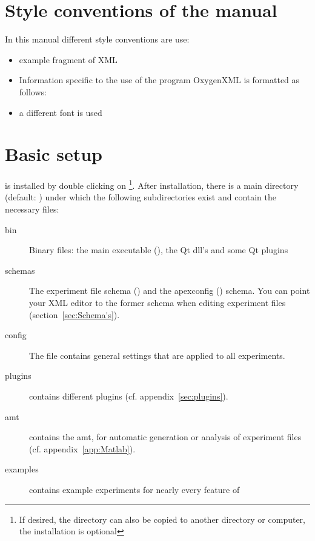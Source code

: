 \section{Style conventions of the manual}
In this manual different style conventions are use:
\begin{itemize}
\item {} example fragment of XML

\item Information specific to the use of the program OxygenXML is
formatted as follows: 

\item a different font is used 
\end{itemize}

\section{Basic setup}

\apex is installed by double clicking on
 \footnote{If desired, the \apex
directory can also be copied to another directory or computer, the
installation is optional}. After installation, there is a main
\apex directory (default: ) under
which the following subdirectories exist and contain the necessary
files:

\begin{description}
\item[bin] Binary files: the main \apex executable
(), the Qt dll's and some Qt plugins

\item[schemas] The experiment file schema
() and the apexconfig
() schema. You can point your XML editor
to the former schema when editing experiment files
(section~\ref{sec:Schema's}).

\item[config] The  file contains general
\apex settings that are applied to all experiments.

\item[plugins] contains different plugins (cf.
appendix~\ref{sec:plugins}).

\item[amt] contains the \ac{amt}, for automatic generation or
analysis of experiment files (cf. appendix~\ref{app:Matlab}).

\item[examples] contains example experiments for nearly every
feature of \apex
\end{description}


